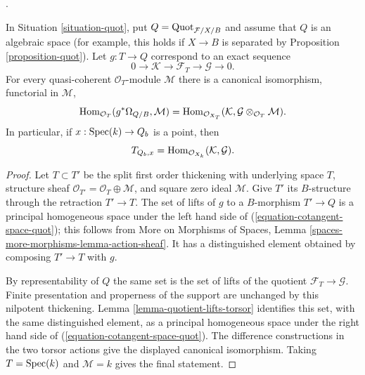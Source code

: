 \begin{lemma}
\label{lemma-cotangent-space-quot}
\begin{reference}
\cite[Expos\'e 221, Corollary 5.3]{FGA}.
\end{reference}
In Situation \ref{situation-quot}, put
$Q = \mathrm{Quot}_{\mathcal{F}/X/B}$ and assume that $Q$ is an algebraic
space (for example, this holds if $X \to B$ is separated by Proposition
\ref{proposition-quot}). Let $g : T \to Q$ correspond to
an exact sequence
$$
0 \longrightarrow \mathcal{K} \longrightarrow \mathcal{F}_T
\longrightarrow \mathcal{G} \longrightarrow 0.
$$
For every quasi-coherent $\mathcal{O}_T$-module $\mathcal{M}$ there is a
canonical isomorphism, functorial in $\mathcal{M}$,
\begin{equation}
\label{equation-cotangent-space-quot}
\mathop{\mathrm{Hom}}\nolimits_{\mathcal{O}_T}(g^*\Omega_{Q/B}, \mathcal{M})
=
\mathop{\mathrm{Hom}}\nolimits_{\mathcal{O}_{X_T}}
(\mathcal{K},
\mathcal{G} \otimes_{\mathcal{O}_T} \mathcal{M}).
\end{equation}
In particular, if $x : \mathop{\mathrm{Spec}}(k) \to Q_b$ is a point, then
$$
T_{Q_b, x} =
\mathop{\mathrm{Hom}}\nolimits_{\mathcal{O}_{X_k}}(\mathcal{K}, \mathcal{G}).
$$
\end{lemma}

\begin{proof}
Let $T \subset T'$ be the split first order thickening with underlying
space $T$, structure sheaf
$\mathcal{O}_{T'} = \mathcal{O}_T \oplus \mathcal{M}$, and square zero
ideal $\mathcal{M}$. Give $T'$ its $B$-structure through the retraction
$T' \to T$. The set of lifts of $g$ to a $B$-morphism $T' \to Q$ is a
principal homogeneous space under the left hand side of
(\ref{equation-cotangent-space-quot}); this follows from More on Morphisms
of Spaces, Lemma \ref{spaces-more-morphisms-lemma-action-sheaf}. It has a
distinguished element obtained by composing $T' \to T$ with $g$.

By representability of $Q$ the same set is the set of lifts of the quotient
$\mathcal{F}_T \to \mathcal{G}$. Finite presentation and properness of the
support are unchanged by this nilpotent thickening. Lemma
\ref{lemma-quotient-lifts-torsor} identifies this set, with the same
distinguished element, as a principal homogeneous space under the right
hand side of (\ref{equation-cotangent-space-quot}). The difference
constructions in the two torsor actions give the displayed canonical
isomorphism. Taking $T = \mathop{\mathrm{Spec}}(k)$ and $\mathcal{M} = k$ gives the final
statement.
\end{proof}

